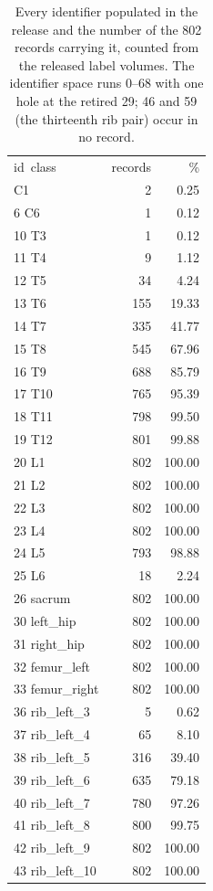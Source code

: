 \begin{table}[htbp]
\caption{Every identifier populated in the release and the number of the 802 records
carrying it, counted from the released label volumes. The identifier space runs 0--68
with one hole at the retired 29; 46 and 59 (the thirteenth rib pair) occur in no record.}
\begin{ruledtabular}
\begin{tabular}{lrr}
id\ class & records & \% \\ \colrule
1 C1 & 2 & 0.25 \\
6 C6 & 1 & 0.12 \\
10 T3 & 1 & 0.12 \\
11 T4 & 9 & 1.12 \\
12 T5 & 34 & 4.24 \\
13 T6 & 155 & 19.33 \\
14 T7 & 335 & 41.77 \\
15 T8 & 545 & 67.96 \\
16 T9 & 688 & 85.79 \\
17 T10 & 765 & 95.39 \\
18 T11 & 798 & 99.50 \\
19 T12 & 801 & 99.88 \\
20 L1 & 802 & 100.00 \\
21 L2 & 802 & 100.00 \\
22 L3 & 802 & 100.00 \\
23 L4 & 802 & 100.00 \\
24 L5 & 793 & 98.88 \\
25 L6 & 18 & 2.24 \\
26 sacrum & 802 & 100.00 \\
30 left\_hip & 802 & 100.00 \\
31 right\_hip & 802 & 100.00 \\
32 femur\_left & 802 & 100.00 \\
33 femur\_right & 802 & 100.00 \\
36 rib\_left\_3 & 5 & 0.62 \\
37 rib\_left\_4 & 65 & 8.10 \\
38 rib\_left\_5 & 316 & 39.40 \\
39 rib\_left\_6 & 635 & 79.18 \\
40 rib\_left\_7 & 780 & 97.26 \\
41 rib\_left\_8 & 800 & 99.75 \\
42 rib\_left\_9 & 802 & 100.00 \\
43 rib\_left\_10 & 802 & 100.00 \\

\end{tabular}
\end{ruledtabular}
\end{table}
